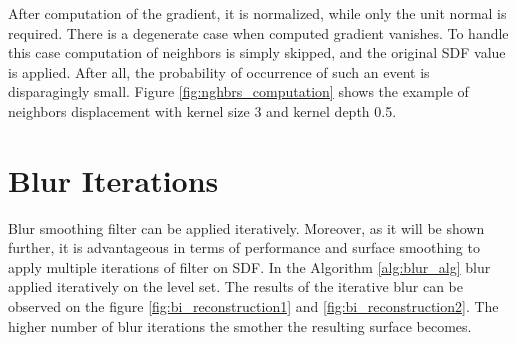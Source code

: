 After computation of the gradient, it is normalized, while only the unit normal is required. There is a degenerate case when computed gradient vanishes. To handle this case computation of neighbors is simply skipped, and the original SDF value is applied. After all, the probability of occurrence of such an event is disparagingly small. Figure \ref{fig:nghbrs_computation} shows the example of neighbors displacement with kernel size 3 and kernel depth 0.5.

\section{Blur Iterations}
Blur smoothing filter can be applied iteratively. Moreover, as it will be shown further, it is advantageous in terms of performance and surface smoothing to apply multiple iterations of filter on SDF. In the Algorithm \ref{alg:blur_alg} blur applied iteratively on the level set. The results of the iterative blur can be observed on the figure \ref{fig:bi_reconstruction1} and \ref{fig:bi_reconstruction2}. The higher number of blur iterations the smother the resulting surface becomes. 
